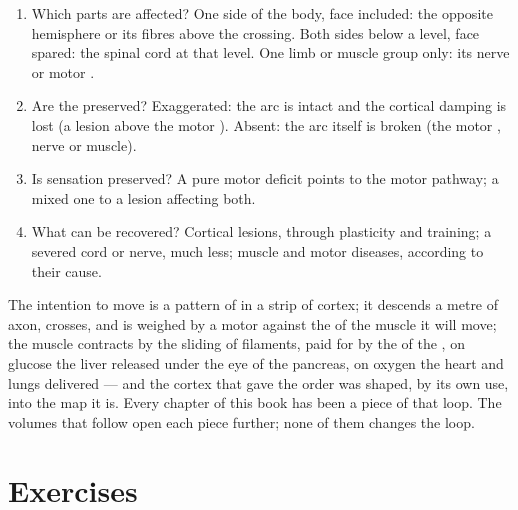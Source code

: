 \begin{method}\label{met:g12:brain-and-movement:locate}
\begin{enumerate}
  \item Which parts are affected? One side of the body, face
        included: the opposite hemisphere or its fibres above the
        crossing. Both sides below a level, face spared: the spinal
        cord at that level. One limb or muscle group only: its nerve or
        motor .
  \item Are the  preserved? Exaggerated: the arc is intact and
        the cortical damping is lost (a lesion above the motor
        ). Absent: the arc itself is broken (the motor ,
        nerve or muscle).
  \item Is sensation preserved? A pure motor deficit points to the
        motor pathway; a mixed one to a lesion affecting both.
  \item What can be recovered? Cortical lesions, through plasticity
        and training; a severed cord or nerve, much less; muscle and
        motor  diseases, according to their cause.
\end{enumerate}
\end{method}

\begin{remark}\label{rem:g12:brain-and-movement:loop}
The intention to move is a pattern of  in a strip of
cortex; it descends a metre of axon, crosses, and is weighed by a
motor  against the  of the muscle it will move; the
muscle contracts by the sliding of filaments, paid for by the  of
the , on glucose the liver released under the eye of the
pancreas, on oxygen the heart and lungs delivered --- and the cortex
that gave the order was shaped, by its own use, into the map it is.
Every chapter of this book has been a piece of that loop. The volumes
that follow open each piece further; none of them changes the
loop.
\end{remark}

\section{Exercises}

